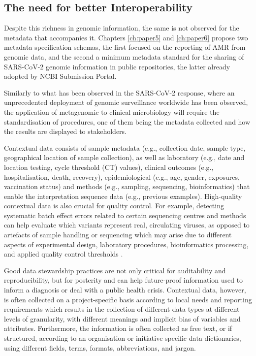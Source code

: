 \subsection{The need for better Interoperability}

Despite this richness in genomic information, the same is not observed for the metadata that accompanies it. Chapters \ref{ch:paper5} and \ref{ch:paper6} propose two metadata specification schemas, the first focused on the reporting of \ac{AMR} from genomic data, and the second a minimum metadata standard for the sharing of \ac{SARS-CoV-2} genomic information in public repositories, the latter already adopted by NCBI Submission Portal. 

Similarly to what has been observed in the \ac{SARS-CoV-2} response, where an unprecedented deployment of genomic surveillance worldwide has been observed, the application of metagenomic to clinical microbiology will require the standardisation of procedures, one of them being the metadata collected and how the results are displayed to stakeholders. 

Contextual data consists of sample metadata (e.g., collection date, sample type, geographical location of sample collection), as well as laboratory (e.g., date and location testing, cycle threshold (CT) values), clinical outcomes (e.g., hospitalisation, death, recovery), epidemiological (e.g., age, gender, exposures, vaccination status) and methods (e.g., sampling, sequencing, bioinformatics) that enable the interpretation sequence data (e.g., previous examples). High-quality contextual data is also crucial for quality control. For example, detecting systematic batch effect errors related to certain sequencing centres and methods can help evaluate which variants represent real, circulating viruses, as opposed to artefacts of sample handling or sequencing which may arise due to different aspects of experimental design, laboratory procedures, bioinformatics processing, and applied quality control thresholds \cite{de_maio_issues_2020, rayko_quality_2020, poon_recurrent_2005}. 

Good data stewardship practices are not only critical for auditability and reproducibility, but for posterity and can help future-proof information used to inform a diagnosis or deal with a public health crisis. Contextual data, however, is often collected on a project-specific basis according to local needs and reporting requirements which results in the collection of different data types at different levels of granularity, with different meanings and implicit bias of variables and attributes. Furthermore, the information is often collected as free text, or if structured, according to an organisation or initiative-specific data dictionaries, using different fields, terms, formats, abbreviations, and jargon.

